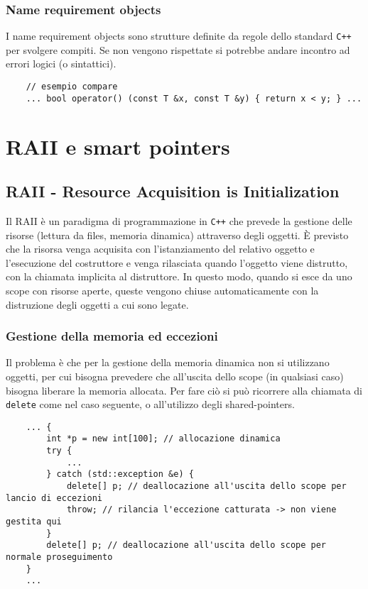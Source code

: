 \documentclass[a4paper]{article}
\begin{document}
\subsubsection*{Name requirement objects}
I name requirement objects sono strutture definite da regole dello standard \verb|C++| per svolgere compiti. Se non vengono
rispettate si potrebbe andare incontro ad errori logici (o sintattici).
\begin{lstlisting}
	// esempio compare
	... bool operator() (const T &x, const T &y) { return x < y; } ...
\end{lstlisting} 

\newpage

\section{RAII e smart pointers}
\subsection{RAII - Resource Acquisition is Initialization}
Il RAII è un paradigma di programmazione in \verb|C++| che prevede la gestione delle risorse (lettura da files, memoria dinamica)
attraverso degli oggetti. È previsto che la risorsa venga acquisita con l'istanziamento del relativo oggetto e l'esecuzione del
costruttore e venga rilasciata quando l'oggetto viene distrutto, con la chiamata implicita al distruttore. In questo modo, quando
si esce da uno scope con risorse aperte, queste vengono chiuse automaticamente con la distruzione degli oggetti a cui sono legate.

\subsubsection*{Gestione della memoria ed eccezioni}
Il problema è che per la gestione della memoria dinamica non si utilizzano oggetti, per cui bisogna prevedere che all'uscita dello
scope (in qualsiasi caso) bisogna liberare la memoria allocata. Per fare ciò si può ricorrere alla chiamata di \verb|delete| come
nel caso seguente, o all'utilizzo degli shared-pointers.
\begin{lstlisting}
	... {
		int *p = new int[100]; // allocazione dinamica
		try {
			...
		} catch (std::exception &e) {
			delete[] p; // deallocazione all'uscita dello scope per lancio di eccezioni
			throw; // rilancia l'eccezione catturata -> non viene gestita qui
		}
		delete[] p; // deallocazione all'uscita dello scope per normale proseguimento
	}
	...
\end{lstlisting}
\end{document}
